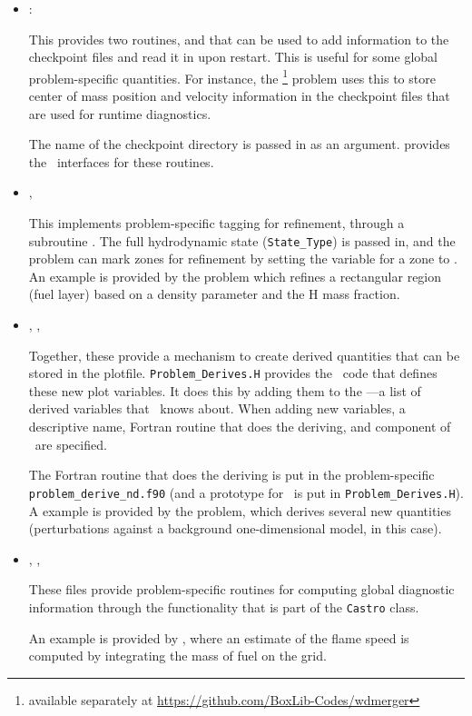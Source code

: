 \begin{itemize}

\item {} :

  This provides two routines,  and
   that can be used to add information to the
  checkpoint files and read it in upon restart.  This is useful for
  some global problem-specific quantities.  For instance, the
  \footnote{available separately at
    \url{https://github.com/BoxLib-Codes/wdmerger}} problem uses this
  to store center of mass position and velocity information in the
  checkpoint files that are used for runtime diagnostics.

  The name of the checkpoint directory is passed in as an argument.
   provides the \cpp\ interfaces for these routines.

\item {}, 

  This implements problem-specific tagging for refinement, through a
  subroutine .  The full hydrodynamic state
  ({\tt State\_Type}) is passed in, and the problem can mark zones for
  refinement by setting the  variable for a zone to
  .  An example is provided by the 
  problem which refines a rectangular region (fuel layer) based on
  a density parameter and the H mass fraction.

\item {}, , 

  Together, these provide a mechanism to create derived quantities
  that can be stored in the plotfile.  {\tt Problem\_Derives.H}
  provides the \cpp\ code that defines these new plot variables.  It
  does this by adding them to the ---a list of
  derived variables that \castro\ knows about.  When adding new
  variables, a descriptive name, Fortran routine that does the
  deriving, and component of \statedata\ are specified.

  The Fortran routine that does the deriving is put in the
  problem-specific {\tt problem\_derive\_nd.f90} (and a prototype for
  \cpp\ is put in {\tt Problem\_Derives.H}).  A example is provided by
  the  problem, which derives several new
  quantities (perturbations against a background one-dimensional
  model, in this case).

\item {}, , 

  These files provide problem-specific routines for computing global
  diagnostic information through the 
  functionality that is part of the {\tt Castro} class.

  An example is provided by , where an estimate
  of the flame speed is computed by integrating the mass of fuel on 
  the grid.

\end{itemize}



